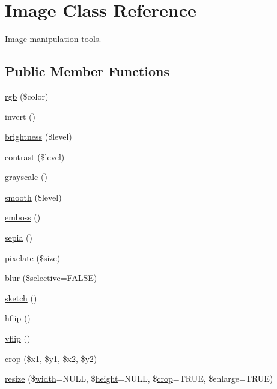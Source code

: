 \hypertarget{class_image}{}\section{Image Class Reference}
\label{class_image}


\hyperlink{class_image}{Image} manipulation tools.  


\subsection*{Public Member Functions}
\begin{DoxyCompactItemize}
\item 
\hyperlink{class_image_ab2758ab5d8c1d2cd3c4e48b72daed2d9}{rgb} (\$color)
\item 
\hyperlink{class_image_a70a743c63f97d5bbfdb2cdab7d186938}{invert} ()
\item 
\hyperlink{class_image_af571c7cddbd8021822dc8a6c36bd4059}{brightness} (\$level)
\item 
\hyperlink{class_image_a7af23605eb273c1084cbbf092bf69c50}{contrast} (\$level)
\item 
\hyperlink{class_image_acc92bb7ca13df725e80732ca8181a0c2}{grayscale} ()
\item 
\hyperlink{class_image_a7ebc6366f3da2bf2af1608663fdb7a09}{smooth} (\$level)
\item 
\hyperlink{class_image_aabc8c1473621bfe3e064dd0a756c935e}{emboss} ()
\item 
\hyperlink{class_image_a4723159606519b101e408854bc65ee35}{sepia} ()
\item 
\hyperlink{class_image_af2baa228f3e2d08bafa8621d4501b113}{pixelate} (\$size)
\item 
\hyperlink{class_image_acdca850837eae7c01092f833157ace57}{blur} (\$selective=F\+A\+L\+SE)
\item 
\hyperlink{class_image_afc92209cb2a19193d46a9338b13a3bb9}{sketch} ()
\item 
\hyperlink{class_image_a24dbd95e2d9306a1bfe43cc344b8af1d}{hflip} ()
\item 
\hyperlink{class_image_ac7bff34c7bb8af86f020474c2f4f2737}{vflip} ()
\item 
\hyperlink{class_image_a4363bcc58d31e100cc126fafad73ef1a}{crop} (\$x1, \$y1, \$x2, \$y2)
\item 
\hyperlink{class_image_a359458680d67cee8333d7af2f078e859}{resize} (\$\hyperlink{class_image_aac6ce1a0981556eb27334db76b666350}{width}=N\+U\+LL, \$\hyperlink{class_image_a40c074d7d21447265a9ce46470c94414}{height}=N\+U\+LL, \$\hyperlink{class_image_a4363bcc58d31e100cc126fafad73ef1a}{crop}=T\+R\+UE, \$enlarge=T\+R\+UE)

\end{DoxyCompactItemize}
